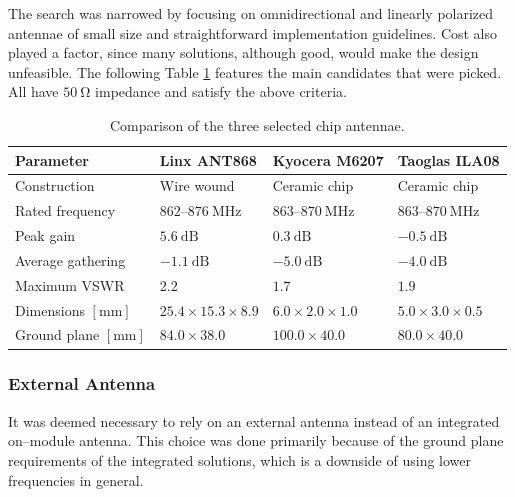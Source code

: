 The search was narrowed by focusing on omnidirectional and linearly polarized antennae of small size and straightforward implementation guidelines. Cost also played a factor, since many solutions, although good, would make the design unfeasible. The following Table \ref{table:antenna-chip} features the main candidates that were picked. All have $50~\mathrm{\Omega}$ impedance and satisfy the above criteria.

\begin{table}
\begin{center}
\caption{\label{table:antenna-chip}Comparison of the three selected chip antennae.}
    \begin{tabular}{|l|l|l|l|} \hline
    \textbf{Parameter} & \textbf{Linx ANT868}\cite{linx_technologies_he_2024} & \textbf{Kyocera M6207}\cite{kyocera_ism_2024} & \textbf{Taoglas ILA08}\cite{taoglas_ila08_nodate} \\ \hline
    Construction & Wire wound & Ceramic chip & Ceramic chip \\ \hline
    Rated frequency                 & $862 \text{--} 876~\mathrm{MHz}$ & $863 \text{--} 870~\mathrm{MHz}$ & $863 \text{--} 870~\mathrm{MHz}$ \\ \hline
    Peak gain                       & $5.6~\mathrm{dB}$     & $0.3~\mathrm{dB}$     & $-0.5~\mathrm{dB}$ \\ \hline
    Average gathering               & $-1.1~\mathrm{dB}$    & $-5.0~\mathrm{dB}$    & $-4.0~\mathrm{dB}$ \\ \hline
    Maximum VSWR                    & $2.2$                 & $1.7$                 & $1.9$ \\ \hline
    Dimensions $\mathrm{[mm]}$      & $25.4 \times 15.3 \times 8.9$ & $6.0 \times 2.0 \times 1.0$ & $5.0 \times 3.0 \times 0.5$ \\ \hline
    Ground plane $\mathrm{[mm]}$    & $84.0 \times 38.0$ & $100.0 \times 40.0$ & $80.0 \times 40.0$ \\ \hline
    \end{tabular}
\end{center}
\end{table}

\subsubsection{External Antenna}
It was deemed necessary to rely on an external antenna instead of an integrated on--module antenna. This choice was done primarily because of the ground plane requirements of the integrated solutions, which is a downside of using lower frequencies in general.

